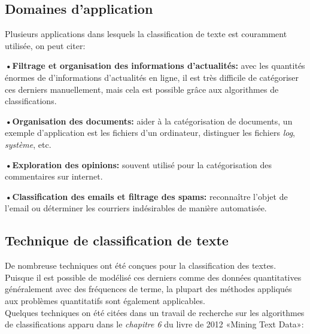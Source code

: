     \subsection{Domaines d'application}
    Plusieurs applications dans lesquels la classification de texte est couramment utilisée, on peut citer:

    \textbf{•Filtrage et organisation des informations d'actualités:} avec les quantités énormes de d'informations d'actualités en ligne, il est très difficile de catégoriser ces derniers manuellement, mais cela est possible grâce aux algorithmes de classifications. 

    \textbf{•Organisation des documents:} aider à la catégorisation de documents, un exemple d'application est les fichiers d'un ordinateur, distinguer les fichiers \emph{log}, \emph{système}, etc.

    \textbf{•Exploration des opinions:} souvent utilisé pour la catégorisation des commentaires sur internet.

    \textbf{•Classification des emails et filtrage des spams:} reconnaître l'objet de l'email ou déterminer les courriers indésirables de manière automatisée.

    \subsection{Technique de classification de texte}
    De nombreuse techniques ont été conçues pour la classification des textes. Puisque il est possible de modélisé ces derniers comme des données quantitatives généralement avec des fréquences de terme, la plupart des méthodes appliqués aux problèmes quantitatifs sont également applicables.\\    
    Quelques techniques on été citées dans un travail de recherche sur les algorithmes de classifications apparu dans le \emph{chapitre 6} du livre de 2012 «Mining Text Data»\cite{stca}:

